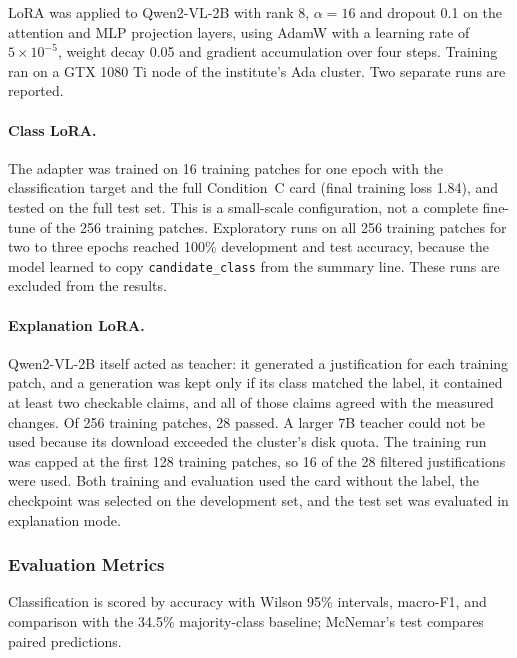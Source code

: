 \documentclass[11pt]{article}
\begin{document}
LoRA  was applied to Qwen2-VL-2B with rank 8,
$\alpha = 16$ and dropout 0.1 on the attention and MLP projection
layers, using AdamW  with a learning rate of
$5 \times 10^{-5}$, weight decay 0.05 and gradient accumulation over
four steps. Training ran on a GTX 1080 Ti node of the institute's Ada
cluster. Two separate runs are reported.

\paragraph{Class LoRA.} The adapter was trained on 16 training patches
for one epoch with the classification target and the full Condition~C
card (final training loss 1.84), and tested on the full test set. This
is a small-scale configuration, not a complete fine-tune of the 256
training patches. Exploratory runs on all 256 training patches for two
to three epochs reached 100\% development and test accuracy, because
the model learned to copy \texttt{candidate\_class} from the summary
line. These runs are excluded from the results.

\paragraph{Explanation LoRA.} Qwen2-VL-2B itself acted as teacher: it
generated a justification for each training patch, and a generation was
kept only if its class matched the label, it contained at least two
checkable claims, and all of those claims agreed with the measured
changes. Of 256 training patches, 28 passed. A larger 7B teacher could
not be used because its download exceeded the cluster's disk quota. The
training run was capped at the first 128 training patches, so 16 of the
28 filtered justifications were used. Both training and evaluation used
the card without the label, the checkpoint was selected on the
development set, and the test set was evaluated in explanation mode.

\subsubsection{Evaluation Metrics}

Classification is scored by accuracy with Wilson 95\% intervals, macro-F1, and comparison with the 34.5\%
majority-class baseline; McNemar's test  compares
paired predictions.
\end{document}
